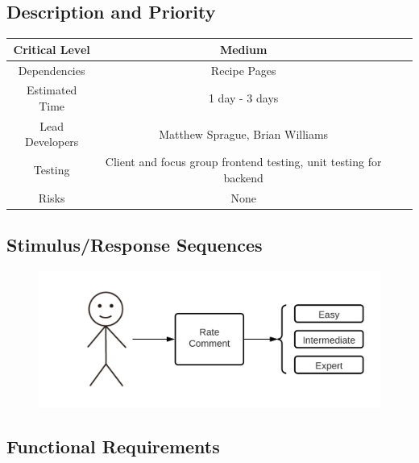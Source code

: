 \documentclass{scrreprt}
\begin{document}
\subsection{Description and Priority}
\begin{center}
    \begin{tabular}{| c | c | c | c |}
        \hline
        Critical Level  & Medium                                                            \\
        \hline
        Dependencies    & Recipe Pages                                                      \\
        \hline
        Estimated Time  & 1 day - 3 days                                                    \\
        \hline
        Lead Developers & Matthew Sprague, Brian Williams                                   \\
        \hline
        Testing         & Client and focus group \gls{frontend} testing,
                          \gls{unit testing} for \gls{backend}                                 \\
        \hline
        Risks           & None                                                              \\
        \hline
    \end{tabular}
\end{center}

\subsection{Stimulus/Response Sequences}

\begin{figure}[H]\centering
    \includegraphics[width=\columnwidth]{FlowCharts/Recipe-Difficulty.png}
\end{figure}

\subsection{\gls{Functional Requirements}}
\end{document}
